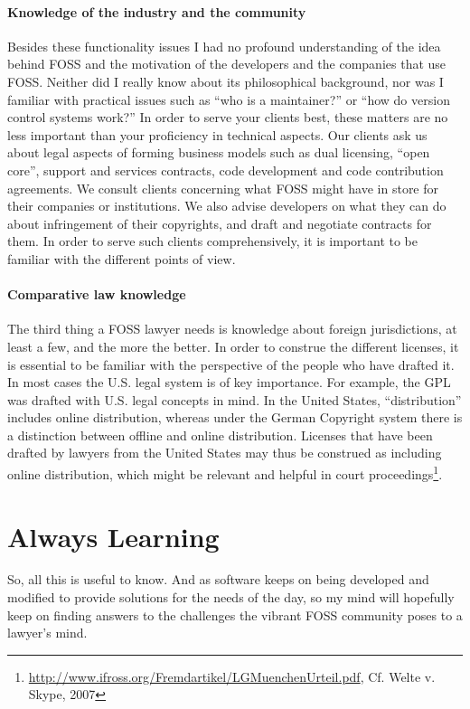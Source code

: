 \paragraph*{Knowledge of the industry and the community}
Besides these functionality issues I had no profound understanding of the idea
behind FOSS and the motivation of the developers and the companies that use
FOSS. Neither did I really know about its philosophical background, nor was I
familiar with practical issues such as ``who is a maintainer?'' or ``how do version control systems work?'' In order to serve your clients best, these matters are no less important than your proficiency in technical aspects.  
Our clients ask us about legal aspects of forming business models such as dual
licensing, ``open core'', support and services contracts, code development and
code contribution agreements. We consult clients concerning what FOSS might have
in store for their companies or institutions. We also advise developers on what
they can do about infringement of their copyrights, and draft and negotiate
contracts for them. In order to serve such clients comprehensively, it is
important to be familiar with the different points of view.  

\paragraph*{Comparative law knowledge}
The third thing a FOSS lawyer needs is knowledge about foreign jurisdictions, at
least a few, and the more the better. In order to construe the different
licenses, it is essential to be familiar with the perspective of the people who
have drafted it. In most cases the U.S. legal system is of key importance. For
example, the GPL was drafted with U.S. legal concepts in mind. In the United
States, ``distribution'' includes online distribution, whereas under the German
Copyright system there is a distinction between offline and online distribution.
Licenses that have been drafted by lawyers from the United States may thus be
construed as including online distribution, which might be relevant and helpful
in court proceedings\footnote{\url{http://www.ifross.org/Fremdartikel/LGMuenchenUrteil.pdf}, Cf. Welte v. Skype, 2007}.
 
\section*{Always Learning}
So, all this is useful to know. And as software keeps on being developed and
modified to provide solutions for the needs of the day, so my mind will
hopefully keep on finding answers to the challenges the vibrant FOSS community
poses to a lawyer's mind.

